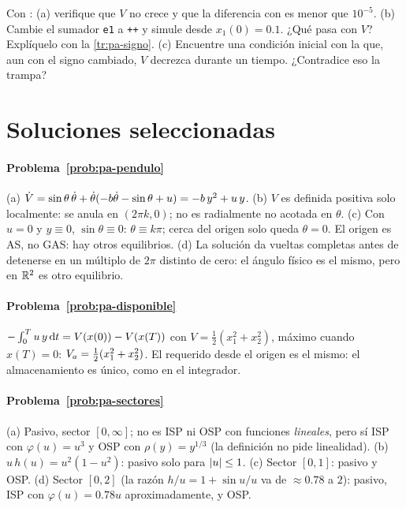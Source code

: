 \begin{problema}\label{prob:pa-signoSL}
\etiquetaM{} Con : (a) verifique que $V$ no crece y que la diferencia con  es menor que $10^{-5}$. (b) Cambie el sumador \texttt{e1} a \texttt{++} y simule desde $x_1(0)=0.1$. ¿Qué pasa con $V$? Explíquelo con la \cref{tr:pa-signo}. (c) \etiquetaEstrella{} Encuentre una condición inicial con la que, aun con el signo cambiado, $V$ decrezca durante un tiempo. ¿Contradice eso la trampa?
\end{problema}

\section{Soluciones seleccionadas}

\paragraph{Problema~\ref{prob:pa-pendulo}}
(a) $\dot V=\sin\theta\,\dot\theta+\dot\theta(-b\dot\theta-\sin\theta+u)=-b\,y^2+u\,y$. (b) $V$ es definida positiva solo localmente: se anula en $(2\pi k,0)$; no es radialmente no acotada en $\theta$. (c) Con $u=0$ y $y\equiv0$, $\sin\theta\equiv0$: $\theta\equiv k\pi$; cerca del origen solo queda $\theta=0$. El origen es AS, no GAS: hay otros equilibrios. (d) La solución da vueltas completas antes de detenerse en un múltiplo de $2\pi$ distinto de cero: el ángulo físico es el mismo, pero en $\mathbb{R}^2$ es otro equilibrio.

\paragraph{Problema~\ref{prob:pa-disponible}}
$-\int_0^Tu\,y\,\mathrm{d} t=V(x(0))-V(x(T))$ con $V=\tfrac12(x_1^2+x_2^2)$, máximo cuando $x(T)=0$: $V_a=\tfrac12(x_1^2+x_2^2)$. El requerido desde el origen es el mismo: el almacenamiento es único, como en el integrador.

\paragraph{Problema~\ref{prob:pa-sectores}}
(a) Pasivo, sector $[0,\infty]$; no es ISP ni OSP con funciones \emph{lineales}, pero sí ISP con $\varphi(u)=u^3$ y OSP con $\rho(y)=y^{1/3}$ (la definición no pide linealidad). (b) $u\,h(u)=u^2(1-u^2)$: pasivo solo para $\left\lvert u\right\rvert\le1$. (c) Sector $[0,1]$: pasivo y OSP. (d) Sector $[0,2]$ (la razón $h/u=1+\sin u/u$ va de $\approx0.78$ a $2$): pasivo, ISP con $\varphi(u)=0.78u$ aproximadamente, y OSP.

